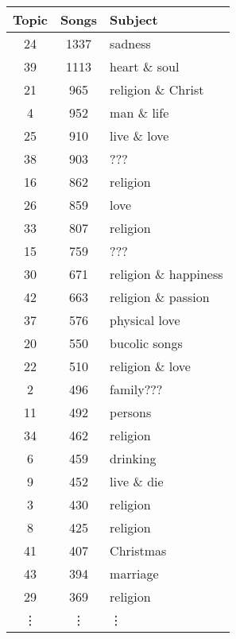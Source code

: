 \begin{table}
	\begin{minipage}{0.5\textwidth}
		\begin{tabular}{ccl}
			\toprule
			Topic & Songs & Subject \\
			\midrule
			24             &  1337 & sadness  \\
			39             &  1113 & heart \& soul \\
			21             &   965 & religion \& Christ \\
			4              &   952 & man \& life \\
			25             &   910 & live \& love \\
			38             &   903 & ??? \\
			16             &   862 & religion \\
			26             &   859 & love \\
			33             &   807 & religion \\
			15             &   759 & ??? \\
			30             &   671 & religion \& happiness \\
			42             &   663 & religion \& passion \\
			37             &   576 & physical love \\
			20             &   550 & bucolic songs \\
			22             &   510 & religion \& love \\
			2              &   496 & family??? \\
			11             &   492 & persons \\
			34             &   462 & religion \\
			6              &   459 &  drinking \\
			9              &   452 & live \& die \\
			3              &   430 & religion \\
			8              &   425 & religion \\
			41             &   407 & Christmas \\
			43             &   394 & marriage \\
			29             &   369 & religion \\
			\vdots & \vdots & \vdots \\
			\bottomrule
		\end{tabular}
	\end{minipage} \hfill
	\begin{minipage}{0.5\textwidth}

\end{minipage}
\end{table}
